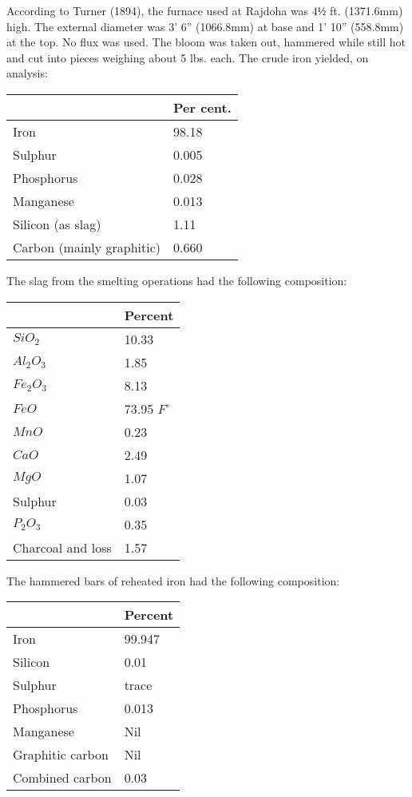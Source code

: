 According to Turner (1894), the furnace used at Rajdoha was $4½$ ft. (1371.6mm) high.  The external diameter was 3' 6'' (1066.8mm) at base and 1' 10'' (558.8mm) at the top. No flux was used.  The bloom was taken out, hammered while still hot and cut into pieces weighing about 5 lbs. each. The crude iron yielded, on analysis:

\begin{center}
\begin{tabular}{|l|l|}
\hline
& Per cent.\\
\hline
Iron & 98.18 \\
\hline
Sulphur & 0.005\\
\hline
Phosphorus & 0.028\\
\hline
Manganese& 0.013\\
\hline
Silicon (as slag) &1.11\\
\hline
Carbon (mainly graphitic)& 0.660\\
\hline
\end{tabular}
\end{center}

The slag from the smelting operations had the following composition:

\begin{center}
\begin{tabular}{|l|l|}
\hline
 & Percent\\
\hline
$SiO_2$ & 10.33\\
\hline
$Al_2O_3$ & 1.85\\
\hline
$Fe_2O_3$  & 8.13\\
\hline
$FeO$ & 73.95\qquad 63.21 $F^\circ$\\
\hline
$MnO$ & 0.23\\
\hline
$CaO$ & 2.49\\
\hline
$MgO$ & 1.07\\
\hline
Sulphur & 0.03\\
\hline
$P_2O_3$ & 0.35\\
\hline
Charcoal and loss & 1.57\\
\hline
\end{tabular}
\end{center}

The hammered bars of reheated iron had the following composition:

\begin{center}
\begin{tabular}{|l|l|}
\hline
 & Percent\\
\hline
Iron & 99.947\\
\hline
Silicon & 0.01\\
\hline
Sulphur & trace\\
\hline
Phosphorus & 0.013\\
\hline
Manganese & Nil\\
\hline
Graphitic carbon & Nil\\
\hline
Combined carbon & 0.03\\
\hline
\end{tabular}
\end{center}

